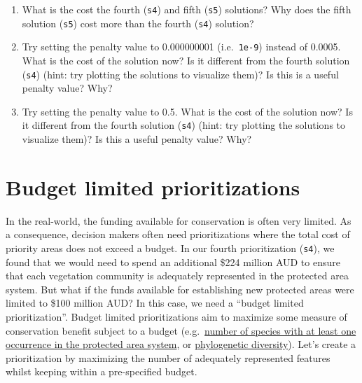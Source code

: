 \documentclass[
  12pt,
]{book}
\makeatletter
\providecommand{\tightlist}{%
  \setlength{\itemsep}{0pt}\setlength{\parskip}{0pt}}
\newenvironment{kframe}{%
\medskip{}
\setlength{\fboxsep}{.8em}
 \def\at@end@of@kframe{}%
 \ifinner\ifhmode%
  \def\at@end@of@kframe{\end{minipage}}%
  \begin{minipage}{\columnwidth}%
 \fi\fi%
 \def\FrameCommand##1{\hskip\@totalleftmargin \hskip-\fboxsep
 \colorbox{shadecolor}{##1}\hskip-\fboxsep
     \hskip-\linewidth \hskip-\@totalleftmargin \hskip\columnwidth}%
 \MakeFramed {\advance\hsize-\width
   \@totalleftmargin\z@ \linewidth\hsize
   \@setminipage}}%
 {\par\unskip\endMakeFramed%
 \at@end@of@kframe}
\newenvironment{rmdblock}[1]
  {
  \begin{itemize}
  \renewcommand{\labelitemi}{
    \raisebox{-.7\height}[0pt][0pt]{
      {\setkeys{Gin}{width=3em,keepaspectratio}\texttt{[image: images/\#1]}}
    }
  }
  \setlength{\fboxsep}{1em}
  \begin{kframe}
  \item
  }
  {
  \end{kframe}
  \end{itemize}
  }
\newenvironment{rmdquestion}
  {\begin{rmdblock}{question}}
  {\end{rmdblock}}
\makeatother
\begin{document}
\begin{rmdquestion}
\begin{enumerate}
\def\labelenumi{\arabic{enumi}.}
\tightlist
\item
  What is the cost the fourth (\texttt{s4}) and fifth (\texttt{s5}) solutions? Why does the fifth solution (\texttt{s5}) cost more than the fourth (\texttt{s4}) solution?
\item
  Try setting the penalty value to 0.000000001 (i.e.~\texttt{1e-9}) instead of 0.0005. What is the cost of the solution now? Is it different from the fourth solution (\texttt{s4}) (hint: try plotting the solutions to visualize them)? Is this is a useful penalty value? Why?
\item
  Try setting the penalty value to 0.5. What is the cost of the solution now? Is it different from the fourth solution (\texttt{s4}) (hint: try plotting the solutions to visualize them)? Is this a useful penalty value? Why?
\end{enumerate}
\end{rmdquestion}

\clearpage

\hypertarget{budget-limited-prioritizations}{%
\section{Budget limited prioritizations}\label{budget-limited-prioritizations}}

In the real-world, the funding available for conservation is often very limited. As a consequence, decision makers often need prioritizations where the total cost of priority areas does not exceed a budget. In our fourth prioritization (\texttt{s4}), we found that we would need to spend an additional \$224 million AUD to ensure that each vegetation community is adequately represented in the protected area system. But what if the funds available for establishing new protected areas were limited to \$100 million AUD? In this case, we need a ``budget limited prioritization''. Budget limited prioritizations aim to maximize some measure of conservation benefit subject to a budget (e.g.~\href{https://prioritizr.net/reference/add_max_cover_objective.html}{number of species with at least one occurrence in the protected area system}, or \href{https://prioritizr.net/reference/add_max_phylo_div_objective.html}{phylogenetic diversity}). Let's create a prioritization by maximizing the number of adequately represented features whilst keeping within a pre-specified budget.
\end{document}
